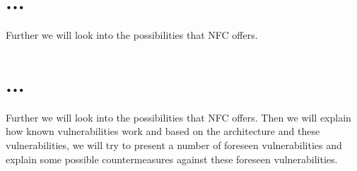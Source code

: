 \section{...}
Further we will look into the possibilities that NFC offers.
 
\section{...}
Further we will look into the possibilities that NFC offers.
Then we will explain how known vulnerabilities work and based on the architecture and these vulnerabilities, we will try to present a number of foreseen vulnerabilities and explain some possible countermeasures against these foreseen vulnerabilities.


